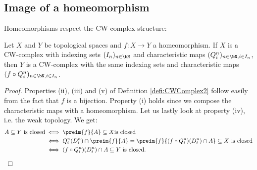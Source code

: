 \subsection{Image of a homeomorphism}

Homeomorphisms respect the CW-complex structure: 

\begin{lem} \label{lem:homeomorph}
    Let $X$ and $Y$ be topological spaces and $f \colon X \to Y$ a homeomorphism. 
    If $X$ is a CW-complex with indexing sets $(I_n)_{n \in \bN}$ and characteristic maps $(Q_i^n)_{n \in \bN, i \in I_n}$, then $Y$ is a CW-complex with the same indexing sets and characteristic maps $(f \circ Q_i^n)_{n \in \bN, i \in I_n}$. 
    \href{https://github.com/scholzhannah/CWComplexes/blob/7be4872a05b534011cc969eb5b80a4b7f0bf57e2/CWcomplexes/Constructions.lean#L140-L182}{\faExternalLink}
\end{lem}
\begin{proof}
    Properties (ii), (iii) and (v) of Definition \ref{defi:CWComplex2} follow easily from the fact that $f$ is a bijection. 
    Property (i) holds since we compose the characteristic maps with a homeomorphism. 
    Let us lastly look at property (iv), i.e. the weak topology. 
    We get: 
    \begin{equation*}
        \begin{split}
            A \subseteq Y \text{ is closed} &\iff \preim{f}{A} \subseteq X \text {is closed} \\
            &\iff Q_i^n(D_i^n) \cap \preim{f}{A} = \preim{f}{(f \circ Q_i^n)(D_i^n) \cap A} \subseteq X \text{ is closed} \\ 
            &\iff (f \circ Q_i^n)(D_i^n) \cap A \subseteq Y \text{ is closed}.
        \end{split}
    \end{equation*}
\end{proof}